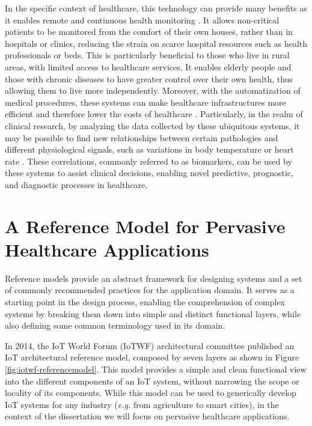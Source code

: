 In the specific context of healthcare, this technology can provide many benefits as it enables remote and continuous health monitoring \cite{Doukas2012, Wu2020, Fan2014}. It allows non-critical patients to be monitored from the comfort of their own houses, rather than in hospitals or clinics, reducing the strain on scarce hospital resources such as health professionals or beds. This is particularly beneficial to those who live in rural areas, with limited access to healthcare services. It enables elderly people and those with chronic diseases to have greater control over their own health, thus allowing them to live more independently. Moreover, with the automatization of medical procedures, these systems can make healthcare infrastructures more efficient and therefore lower the costs of healthcare \cite{Catarinucci2015, Adame2018}. Particularly, in the realm of clinical research, by analyzing the data collected by these ubiquitous systems, it may be possible to find new relationships between certain pathologies and different physiological signals, such as variations in body temperature or heart rate \cite{Choi2016}. These correlations, commonly referred to as biomarkers, can be used by these systems to assist clinical decisions, enabling novel predictive, prognostic, and diagnostic processes in healthcare.

\section{A Reference Model for Pervasive Healthcare Applications}

Reference models provide an abstract framework for designing systems and a set of commonly recommended practices for the application domain. It serves as a starting point in the design process, enabling the comprehension of complex systems by breaking them down into simple and distinct functional layers, while also defining some common terminology used in its domain. \bigskip

In 2014, the \acs{IoT} World Forum (IoTWF) architectural committee published an \acs{IoT} architectural reference model, composed by seven layers as shown in Figure \ref{fig:iotwf-referencemodel}. This model \cite{Cisco2014} provides a simple and clean functional view into the different components of an \acs{IoT} system, without narrowing the scope or locality of its components. While this model can be used to generically develop \acs{IoT} systems for any industry (\textit{e.g.} from agriculture to smart cities), in the context of the dissertation we will focus on pervasive healthcare applications. \bigskip

